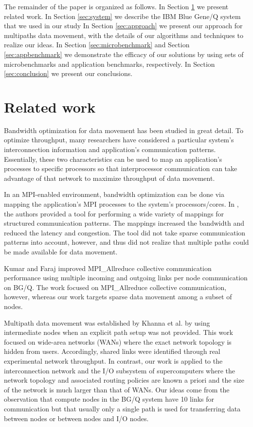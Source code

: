 \documentclass[final,5p,times]{elsarticle}
\begin{document}
The remainder of the paper is organized as follows. In Section \ref{sec:relatedwork} we present related work.
In Section \ref{sec:system}
we describe the IBM Blue Gene/Q system that we used in our study
In Section \ref{sec:approach}
we present our approach for multipaths data movement,
with the details of our algorithms and techniques to realize our ideas.
In Section \ref{sec:microbenchmark} and Section \ref{sec:appbenchmark} we demonstrate the efficacy of our solutions by using sets of microbenchmarks and application benchmarks, respectively.
In Section \ref{sec:conclusion}
we present our conclusions.

\section{Related work}
\label{sec:relatedwork}
Bandwidth optimization for data movement has been studied in great detail.
To optimize throughput, many researchers have considered a particular system's interconnection information and application's communication patterns. Essentially, these two characteristics can be used to map an application's processes to specific processors so that interprocessor communication can take advantage of that network to maximize throughput of data movement.

In an MPI-enabled environment, bandwidth optimization can be done via mapping the application's MPI processes to the system's processors/cores. In \cite{Bhatele:mapping}, the authors provided a tool for performing a wide variety of mappings for structured communication patterns. The mappings increased the bandwidth and reduced the latency and congestion. The tool did not take sparse communication patterns into account, however, and thus did not realize that multiple paths could be made available for data movement.

Kumar and Faraj \cite{Kumar:Allreduce} improved MPI\_Allreduce collective communication performance using multiple incoming and outgoing links per node communication on BG/Q. The work focused on MPI\_Allreduce collective communication, however, whereas our work targets sparse data movement among a subset of nodes.

Multipath data movement was established by Khanna et al. \cite{Proxies:Gaurav} by using intermediate nodes when an explicit path setup was not provided. This work focused on wide-area networks (WANs) where the exact network topology is hidden from users. Accordingly, shared links were identified through real experimental network throughput. In contrast, our work is applied to the interconnection network and the I/O subsystem of supercomputers where the network topology and associated routing policies are known a priori and the size of the network is much larger than that of WANs. Our ideas come from the observation that compute nodes in the BG/Q system have 10 links for communication but that usually only a single path is used for transferring data between nodes or between nodes and I/O nodes.
\end{document}
